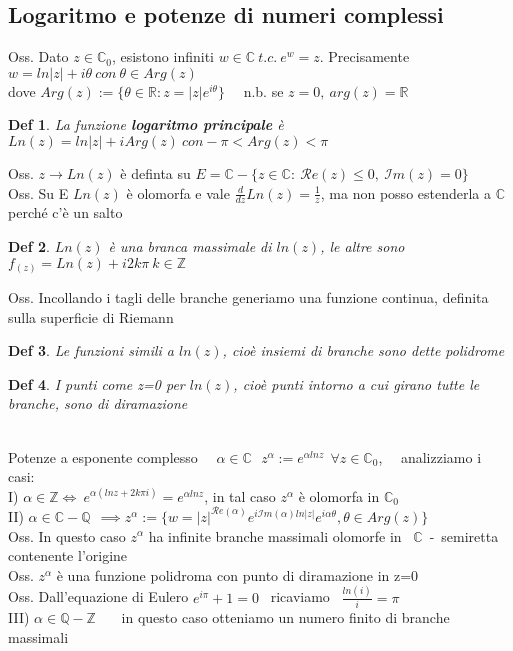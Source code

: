 \documentclass{article}
\theoremstyle{unnumbered}
\newtheorem* {theoremT}{Def}
\theoremstyle{unnumbered1}
\newenvironment{defi}{\begin{gBox}\begin{theoremT}}{\end{theoremT}\end{gBox}}
\begin{document}
\subsection{Logaritmo e potenze di numeri complessi}
%
Oss. Dato $z\in\mathbb{C}_0$, esistono infiniti $w\in\mathbb{C} \ t.c. \ e^w=z$. Precisamente $w=ln|z|+i\theta \ con\ \theta\in Arg(z)$\\
dove $Arg(z):=\{\theta\in\mathbb{R} : z=|z|e^{i\theta} \}$ \ \ n.b. se $z=0,\  arg(z)=\mathbb{R}$\\
%
\begin{defi} 
La funzione \textbf{logaritmo principale} è $Ln(z)=ln|z| + iArg(z) \ con -\pi<Arg(z)<\pi$
\end{defi}
%
Oss. $z\rightarrow Ln(z)$ è definta su $E=\mathbb{C} -\{z\in\mathbb{C} :\ \mathcal{R}e(z)\le 0 ,\ \mathcal{I}m(z)=0 \} $\\
%
Oss. Su E $Ln(z)$ è olomorfa e vale $\frac{d}{dz} Ln(z)=\frac1z$, ma non posso estenderla a $\mathbb{C}$ perché c'è un salto\\
%
\begin{defi} 
$Ln(z)$ è una branca massimale di $ln(z)$, le altre sono $f_(z)=Ln(z) +i2k\pi  \ k\in\mathbb{Z}$
\end{defi}
%
Oss. Incollando i tagli delle branche generiamo una funzione continua, definita sulla superficie di Riemann\\
%
\begin{defi}Le funzioni simili a $ln(z)$, cioè insiemi di branche sono dette polidrome
\end{defi}
%
\begin{defi} 
I punti come z=0 per $ln(z)$, cioè punti intorno a cui girano tutte le branche, sono di diramazione
\end{defi}
\phantom{}\\
%
%
Potenze a esponente complesso \ \  $\alpha\in\mathbb{C} \ \ \ z^{\alpha}:=e^{\alpha lnz} \ \ \forall z\in\mathbb{C}_0$, \ \ analizziamo i casi: \vspace{0.08in}\\
%
I) $\alpha\in\mathbb{Z} \Longleftrightarrow \ e^{\alpha(lnz+2k\pi i)}=e^{\alpha lnz}$, in tal caso $z^{\alpha}$ è olomorfa in $\mathbb{C}_0$\vspace{0.08in}\\
%
II) $\alpha\in\mathbb{C}-\mathbb{Q} \ \ \implies z^{\alpha}:=\{w=|z|^{\mathcal{R}e(\alpha)} e^{i\mathcal{I}m(\alpha)ln|z|} e^{i\alpha\theta}, \theta\in Arg(z) \}$\\
Oss. In questo caso $z^{\alpha}$ ha infinite branche massimali olomorfe in \ $\mathbb{C}$\ -\ 
semiretta contenente l'origine\\
Oss. $z^{\alpha}$ è una funzione polidroma con punto di diramazione in z=0\\ 
Oss. Dall'equazione di Eulero $e^{i\pi}+1=0$ \ ricaviamo \ $\frac{ln(i)}{i}=\pi$
\vspace{0.08in}\\
%
III) $\alpha\in\mathbb{Q}-\mathbb{Z}$ \ \ \ in questo caso otteniamo un numero finito di branche massimali \\ 
\end{document}
